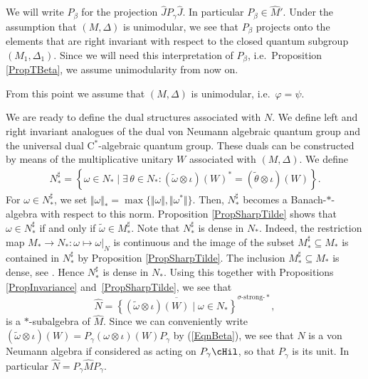 We will write $P_\beta$ for the projection $\hat{J} P_\gamma \hat{J}$. In particular $P_\beta \in \hat{M}'$. Under the assumption that $(M, \Delta)$ is unimodular, we see that $P_\beta$ projects onto the elements that are right invariant with respect to the closed quantum subgroup $(M_1 ,\Delta_1)$. Since we will need this interpretation of $P_\beta$, i.e.\ Proposition \ref{PropTBeta}, we assume unimodularity from now on.

\begin{nt}\label{NtUnimodular}
From this point we assume that $(M, \Delta)$ is unimodular, i.e.\ $\varphi = \psi$.
\end{nt}

We are ready to def\/ine the dual structures associated with $N$. We def\/ine left and right invariant analogues of the dual von Neumann algebraic quantum group and the universal dual C$^\ast$-algebraic quantum group. These duals can be constructed by means of the multiplicative unitary $W$ associated with $(M, \Delta)$. We def\/ine
\begin{gather*}%
N_\ast^\sharp = \left\{\omega \in N_\ast \mid \exists\, \theta \in N_\ast: (\tilde{\omega} \otimes \iota)(W)^\ast = (\tilde{\theta} \otimes \iota)(W) \right\}.
\end{gather*}
For $\omega \in N_\ast^\sharp$, we set $\Vert \omega \Vert_\ast = \max \{ \Vert \omega \Vert, \Vert \omega^\ast \Vert \}$. Then, $N_\ast^\sharp$ becomes a Banach-$\ast$-algebra with respect to this norm. Proposition \ref{PropSharpTilde} shows that $\omega \in N_\ast^\sharp$ if and only if $\tilde{\omega} \in M_\ast^\sharp$. Note that  $N_\ast^\sharp$ is dense in $N_\ast$. Indeed, the restriction map $M_\ast \rightarrow N_\ast: \omega \mapsto \omega\vert_N$  is continuous and the image of the subset $M_\ast^\sharp \subseteq M_\ast$ is contained in $N_\ast^\sharp$ by Proposition \ref{PropSharpTilde}. The inclusion $M_\ast^\sharp  \subseteq M_\ast$ is dense, see  \cite[Lemma 2.5]{KusVaeII}. Hence $N_\ast^\sharp$ is dense in $N_\ast$. Using this together with Propositions \ref{PropInvariance} and~\ref{PropSharpTilde}, we see that
\[
\hat{N} = \overline{\left\{ (\tilde{\omega} \otimes \iota)(W) \mid \omega \in N_\ast \right\}}^{\sigma\text{-strong-}\ast},
\]
is a $\ast$-subalgebra of $\hat{M}$. Since we can conveniently write
$
(\tilde{\omega} \otimes \iota)(W) = P_\gamma (\omega \otimes \iota)(W) P_\gamma
$
by (\ref{EqnBeta}),
 we see that $\hat{N}$ is a von Neumann algebra if considered as acting on $P_\gamma \cHil$, so that $P_\gamma$ is its unit. In particular $\hat{N} = P_\gamma \hat{M} P_\gamma$.

